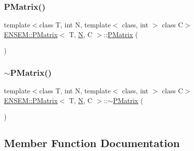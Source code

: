 \mbox{\label{classENSEM_1_1PMatrix_ae32acebccb43c577a9e4dde0866a6c78}} 
\subsubsection{\texorpdfstring{PMatrix()}{PMatrix()}\hspace{0.1cm}{\footnotesize\ttfamily [2/2]}}
{\footnotesize\ttfamily template$<$class T, int N, template$<$ class, int $>$ class C$>$ \\
\mbox{\hyperlink{classENSEM_1_1PMatrix}{E\+N\+S\+E\+M\+::\+P\+Matrix}}$<$ T, \mbox{\hyperlink{operator__name__util_8cc_a7722c8ecbb62d99aee7ce68b1752f337}{N}}, C $>$\+::\mbox{\hyperlink{classENSEM_1_1PMatrix}{P\+Matrix}} (\begin{DoxyParamCaption}{ }\end{DoxyParamCaption})\hspace{0.3cm}{\ttfamily [inline]}}

\mbox{\label{classENSEM_1_1PMatrix_a3196ba50adba3cc1e72bb29ce0b02cda}} 
\subsubsection{\texorpdfstring{$\sim$PMatrix()}{~PMatrix()}\hspace{0.1cm}{\footnotesize\ttfamily [2/2]}}
{\footnotesize\ttfamily template$<$class T, int N, template$<$ class, int $>$ class C$>$ \\
\mbox{\hyperlink{classENSEM_1_1PMatrix}{E\+N\+S\+E\+M\+::\+P\+Matrix}}$<$ T, \mbox{\hyperlink{operator__name__util_8cc_a7722c8ecbb62d99aee7ce68b1752f337}{N}}, C $>$\+::$\sim$\mbox{\hyperlink{classENSEM_1_1PMatrix}{P\+Matrix}} (\begin{DoxyParamCaption}{ }\end{DoxyParamCaption})\hspace{0.3cm}{\ttfamily [inline]}}



\subsection{Member Function Documentation}
\mbox{\label{classENSEM_1_1PMatrix_a4d8aeb469d2295dc8c555a0180ab0613}} 
